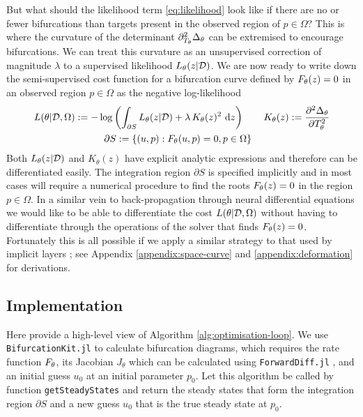 But what should the likelihood term \eqref{eq:likelihood} look like if there are no or fewer bifurcations than targets present in the observed region of $p\in\Omega$? This is where the curvature of the determinant $\partial_{T_{\theta}}^2\Delta_{\theta}$ can be extremised to encourage bifurcations. We can treat this curvature as an unsupervised correction of magnitude $\lambda$ to a supervised likelihood $L_{\theta}(z|\mathcal{D})$. We are now ready to write down the semi-supervised cost function for a bifurcation curve defined by $F_{\theta}(z)=0$ in an observed region $p\in\Omega$ as the negative log-likelihood
\begin{align}
    L(\theta|\mathcal{D},\Omega) := -\log\left(\int_{\partial S}
    L_{\theta}(z|\mathcal{D}) + \lambda\,K_{\theta}(z)^2\,
    \,\mathrm{d}z\right)\qquad
     K_{\theta}(z):=\frac{\partial^2\Delta_{\theta}}{\partial T_{\theta}^2}\\
     \partial S := \{ (u,p) : F_{\theta}(u,p)=0, p\in\Omega \}
     \qquad\qquad\qquad\qquad
\end{align}
Both $L_{\theta}(z|\mathcal{D})$ and $K_{\theta}(z)$ have explicit analytic expressions and therefore can be differentiated easily. The integration region $\partial S$ is specified implicitly and in most cases will require a numerical procedure to find the roots $F_{\theta}(z)=0$ in the region $p\in\Omega$. In a similar vein to back-propagation through neural differential equations \cite{Chen2018NeuralEquations} we would like to be able to differentiate the cost $L(\theta|\mathcal{D},\Omega)$ without having to differentiate through the operations of the solver that finds $F_{\theta}(z)=0$. Fortunately this is all possible if we apply a similar strategy to that used by implicit layers \cite{Look2020DifferentiableLayers}; see Appendix \ref{appendix:space-curve} and \ref{appendix:deformation} for derivations.


\subsection{Implementation}
Here provide a high-level view of Algorithm \ref{alg:optimisation-loop}. We use \texttt{BifurcationKit.jl} \cite{Veltz2019PseudoArcLengthContinuation.jl} to calculate bifurcation diagrams, which requires the rate function $F_{\theta}$, its Jacobian $J_\theta$ which can be calculated using \texttt{ForwardDiff.jl} \cite{Revels2016Forward-ModeJulia}, and an initial guess $u_0$ at an initial parameter $p_0$. Let this algorithm be called by function \texttt{getSteadyStates} and return the steady states that form the integration region $\partial S$ and a new guess $u_0$ that is the true steady state at $p_0$.


